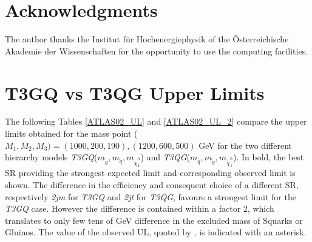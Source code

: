 \documentclass[epj,nopacs,fleqn]{svjour}
\begin{document}


%
\section*{Acknowledgments}
The author thanks the Institut f\"ur Hochenergiephysik of the \"Osterreichische Akademie der Wissenschaften for the opportunity to use the computing facilities.
%
\appendix
\section{T3GQ vs T3QG Upper Limits}\label{app:ul}
The following Tables \ref{ATLAS02_UL} and \ref{ATLAS02_UL_2}  compare the upper limits obtained for the mass point ($M_1,M_2,M_3) = (1000,200,190),(1200,600,500)$ GeV for the two different hierarchy models \textit{T3GQ}($m_{\tilde g}, m_{\tilde q}, m_{\tilde \chi _1 ^0 }$) and \textit{T3QG}($m_{\tilde q}, m_{\tilde g}, m_{\tilde \chi _1 ^0 }$). In bold, the best SR providing the strongest expected limit and corresponding observed limit is shown. The difference in the efficiency and consequent choice of a different SR, respectively \textit{2jm} for \textit{T3GQ} and \textit{2jt} for \textit{T3QG}, favours a strongest limit for the \textit{T3GQ} case. However the difference is contained within a factor 2, which translates to only few tens of GeV difference in the excluded mass of Squarks or Gluinos. The value of the observed UL, quoted by \SMO, is indicated with an asterisk. 
\end{document}
